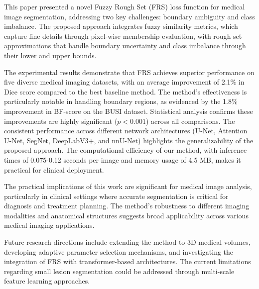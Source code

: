 \documentclass[review]{elsarticle}
\begin{document}
This paper presented a novel Fuzzy Rough Set (FRS) loss function for medical image segmentation, addressing two key challenges: boundary ambiguity and class imbalance. The proposed approach integrates fuzzy similarity metrics, which capture fine details through pixel-wise membership evaluation, with rough set approximations that handle boundary uncertainty and class imbalance through their lower and upper bounds.

The experimental results demonstrate that FRS achieves superior performance on five diverse medical imaging datasets, with an average improvement of 2.1\% in Dice score compared to the best baseline method. The method's effectiveness is particularly notable in handling boundary regions, as evidenced by the 1.8\% improvement in BF-score on the BUSI dataset. Statistical analysis confirms these improvements are highly significant ($p < 0.001$) across all comparisons. The consistent performance across different network architectures (U-Net, Attention U-Net, SegNet, DeepLabV3+, and nnU-Net) highlights the generalizability of the proposed approach. The computational efficiency of our method, with inference times of 0.075-0.12 seconds per image and memory usage of 4.5 MB, makes it practical for clinical deployment.


The practical implications of this work are significant for medical image analysis, particularly in clinical settings where accurate segmentation is critical for diagnosis and treatment planning. The method's robustness to different imaging modalities and anatomical structures suggests broad applicability across various medical imaging applications.

Future research directions include extending the method to 3D medical volumes, developing adaptive parameter selection mechanisms, and investigating the integration of FRS with transformer-based architectures. The current limitations regarding small lesion segmentation could be addressed through multi-scale feature learning approaches.



\end{document}
